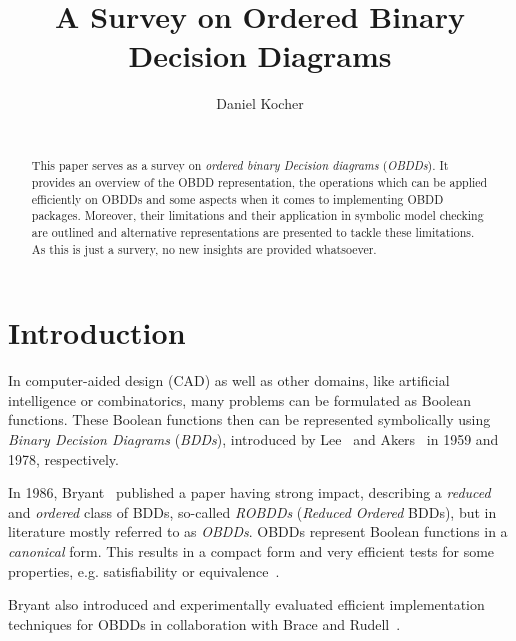 \documentclass{vldb}
\begin{document}
\title{A Survey on Ordered Binary Decision Diagrams}


\author{
\alignauthor
	Daniel Kocher\\
    \\
}

\maketitle

\begin{abstract}
This paper serves as a survey on \textit{ordered binary Decision diagrams}
(\textit{OBDDs}). It provides an overview of the OBDD representation, the
operations which can be applied efficiently on OBDDs and some aspects when it
comes to implementing OBDD packages. Moreover, their limitations and their
application in symbolic model checking are outlined and alternative representations
are presented to tackle these limitations. As this is just a survery, no new
insights are provided whatsoever.
\end{abstract}

\section{Introduction}
\label{sec:introduction}

In computer-aided design (CAD) as well as other domains, like artificial
intelligence or combinatorics, many problems can be formulated as Boolean
functions. These Boolean functions then can be represented symbolically using
\textit{Binary Decision Diagrams} (\textit{BDDs}), introduced by Lee~\cite{LEE59}
and Akers~\cite{AKERS78} in 1959 and 1978, respectively.

In 1986, Bryant~\cite{BRYANT86} published a paper having strong impact, describing
a \textit{reduced} and \textit{ordered} class of BDDs, so-called \textit{ROBDDs}
(\textit{Reduced Ordered} BDDs), but in literature mostly referred to as
\textit{OBDDs}. OBDDs represent Boolean functions in a \textit{canonical}
form. This results in a compact form and very efficient tests for some properties,
e.g. satisfiability or equivalence~\cite{BRYANT86}.

Bryant also introduced and experimentally evaluated efficient implementation
techniques for OBDDs in collaboration with Brace and
Rudell~\cite{BRACE90, BRYANT92}.
\end{document}
